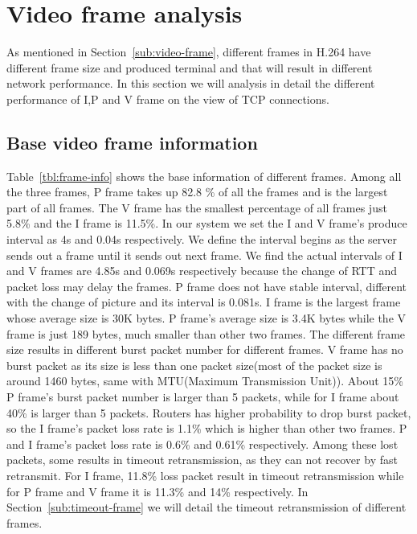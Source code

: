 
\section{Video frame analysis}
\label{sec:frame-analysis}

As mentioned in Section~\ref{sub:video-frame}, different frames in H.264 have different frame size and produced terminal and that will result in different network performance. In this section we will analysis in detail the different performance of I,P and V frame on the view of TCP connections. 

\subsection{Base video frame information}
\label{sub:base-frame}

Table~\ref{tbl:frame-info} shows the base information of different frames. Among all the three frames, P frame takes up 82.8 \%  of all the frames and is the largest part of all frames. The V frame has the smallest percentage of all frames just 5.8\% and the I frame is 11.5\%. In our system we set the I and V frame's produce interval as 4s and 0.04s respectively. We define the interval begins as the server sends out a frame until it sends out next frame. We find the actual intervals of I and V frames are 4.85s and 0.069s respectively because the change of RTT and packet loss may delay the frames. P frame does not have stable interval, different with the change of picture and its interval is 0.081s. I frame is the largest frame whose average size is 30K bytes. P frame's average size is 3.4K bytes while the V frame is just 189 bytes, much smaller than other two frames. The different frame size results in different burst packet number for different frames. V frame has no burst packet as its size is less than one packet size(most of the packet size is around 1460 bytes, same with MTU(Maximum Transmission Unit)). About 15\% P frame's burst packet number is larger than 5 packets, while for I frame about 40\% is larger than 5 packets. Routers has higher probability to drop burst packet, so the I frame's packet loss rate is 1.1\% which is higher than other two frames. P and I frame's packet loss rate is 0.6\% and 0.61\% respectively. Among these lost packets, some results in timeout retransmission, as they can not recover by fast retransmit. For I frame, 11.8\% loss packet result in timeout retransmission while for P frame and V frame it is 11.3\% and 14\% respectively. In Section~\ref{sub:timeout-frame} we will detail the timeout retransmission of different frames.

